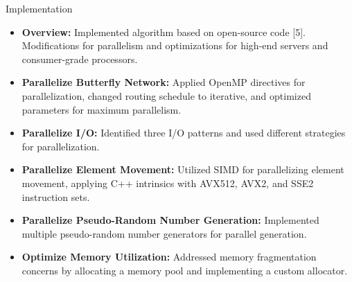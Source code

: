 \documentclass[final,hyperref={pdfpagelabels=false}]{beamer}
\begin{document}
\begin{frame}
\begin{columns}[t]
\begin{column}{.30\linewidth}
    

      \begin{block}{Implementation}
        \begin{itemize}
          \item \textbf{Overview:} Implemented algorithm based on open-source code [5]. Modifications for parallelism and optimizations for high-end servers and consumer-grade processors.
          \item \textbf{Parallelize Butterfly Network:} Applied OpenMP directives for parallelization, changed routing schedule to iterative, and optimized parameters for maximum parallelism.
          \item \textbf{Parallelize I/O:} Identified three I/O patterns and used different strategies for parallelization.
          \item \textbf{Parallelize Element Movement:} Utilized SIMD for parallelizing element movement, applying C++ intrinsics with AVX512, AVX2, and SSE2 instruction sets.
          \item \textbf{Parallelize Pseudo-Random Number Generation:} Implemented multiple pseudo-random number generators for parallel generation.
          \item \textbf{Optimize Memory Utilization:} Addressed memory fragmentation concerns by allocating a memory pool and implementing a custom allocator.
        \end{itemize}
      \end{block}

    \end{column}
  


\end{columns}
\end{frame}
\end{document}
